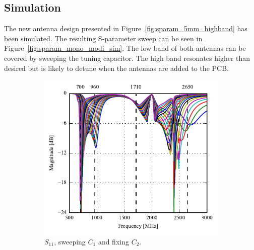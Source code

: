 \FloatBarrier
\subsection{Simulation}
\label{sec:highbandsimulations}


The new antenna design presented in Figure~\ref{fig:sparam_5mm_highband} has been simulated. The resulting S-parameter sweep can be seen in Figure~\ref{fig:sparam_mono_modi_sim}. The low band of both antennas can be covered by sweeping the tuning capacitor. The high band resonates higher than desired but is likely to detune when the antennas are added to the PCB.

\begin{figure}[htbp]
   \begin{subfigure}[b]{0.49\linewidth}
        \centering
        \includegraphics{img/tech_sol/monopole/highband/sim/s11.pdf}
        \caption{$S_{11}$, sweeping $C_1$ and fixing $C_2$.}
   \end{subfigure}
    \hfill
    \begin{subfigure}[b]{0.49\linewidth}
        \centering

\end{subfigure}
\end{figure}
